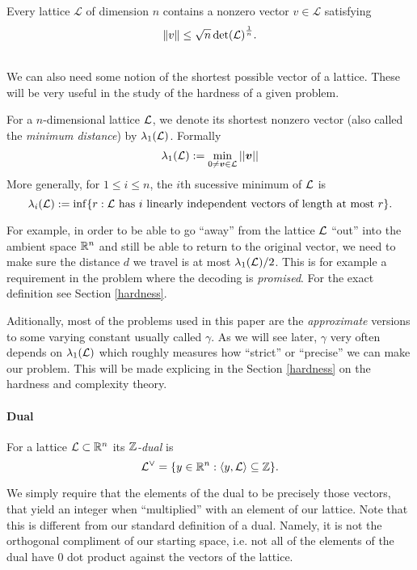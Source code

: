 \begin{theorem}
    Every lattice $\mathcal{L}$ of dimension $n$ contains a nonzero vector $v \in \mathcal{L}$ satisfying
    $$ \norm{v} \leq \sqrt{n} \det(\mathcal{L})^{\frac{1}{n}}.$$
\end{theorem}
\\
\fi
We can also need some notion of the shortest possible vector of a lattice. These will be very useful in the study of the hardness of a given problem.
\begin{definition}
	For a $n$-dimensional lattice $\mathcal{L}$, we denote its shortest nonzero vector (also called the \textit{minimum distance}) by $\lambda_1(\mathcal{L})$. Formally
	\[ \lambda_1(\mathcal{L}) := \min_{0 \neq \boldsymbol{v} \in \mathcal{L}} ||\boldsymbol{v}|| \]
	More generally, for $1 \leq i \leq n$, the $i$th sucessive minimum of $\mathcal{L}$ is
	\[\lambda_i(\mathcal{L}) := \inf \{r : \mathcal{L} \text{ has $i$ linearly independent vectors of length at most } r \}. \]
\end{definition}
For example, in order to be able to go ``away'' from the lattice $\mathcal{L}$ ``out'' into the ambient space $\mathbb{R}^n$ and still be able to return to the original vector, we need to make sure the distance $d$ we travel is at most $\lambda_1(\mathcal{L})/2$. This is for example a requirement in the  problem where the decoding is \textit{promised}. For the exact definition see Section \ref{hardness}.

Aditionally, most of the problems used in this paper are the \textit{approximate} versions to some varying constant usually called $\gamma$. As we will see later, $\gamma$ very often depends on $\lambda_1(\mathcal{L})$ which roughly measures how ``strict'' or ``precise'' we can make our problem. This will be made explicing in the Section \ref{hardness} on the hardness and complexity theory.

\paragraph{Dual}
\begin{definition}[Dual]
    For a lattice $\mathcal{L} \subset \mathbb{R}^n$ its $\mathbb{Z}$\textit{-dual} is
    \[ \mathcal{L}^{\vee} = \{ y \in \mathbb{R}^n : \langle y,\mathcal{L} \rangle \subseteq \mathbb{Z} \}.\]
\end{definition}

We simply require that the elements of the dual to be precisely those vectors, that yield an integer when ``multiplied'' with an element of our lattice. Note that this is different from our standard definition of a dual. Namely, it is not the orthogonal compliment of our starting space, i.e. not all of the elements of the dual have 0 dot product against the vectors of the lattice.

